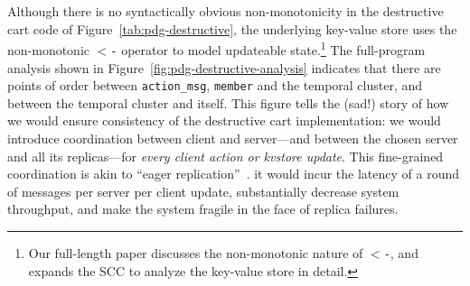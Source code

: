 


Although there is no syntactically obvious non-monotonicity in the destructive
cart code of Figure~\ref{tab:pdg-destructive}, the underlying key-value store uses the non-monotonic \texttt{$<$-} operator to model updateable state.\footnote{Our full-length paper discusses the non-monotonic nature of \texttt{$<$-}, and expands the SCC to analyze the
key-value store in detail.}
The full-program analysis shown in Figure~\ref{fig:pdg-destructive-analysis}
indicates that there are
points of order between \texttt{action\_msg}, \texttt{member} and the temporal cluster,
and between the temporal cluster and itself.
This figure tells the (sad!) story of how we would ensure consistency of the destructive cart implementation: we would introduce coordination
between client and server---and between the chosen server and all its replicas---for {\em every client action or kvstore update}.  This fine-grained coordination is akin to ``eager replication''~\cite{dangers}. it would incur the latency of a round of messages per server per client update, substantially decrease system throughput, and make the system fragile in the face of replica failures.

